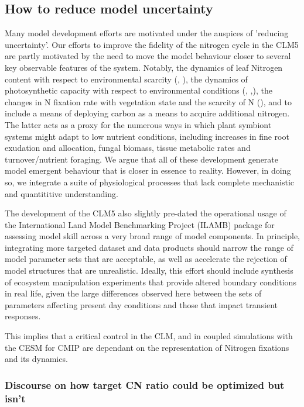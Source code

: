 \documentclass[draft,linenumbers]{agujournal}
\begin{document}
\subsection{How to reduce model uncertainty}
Many model development efforts are motivated under the auspices of 'reducing uncertainty'.  Our efforts to improve the fidelity of the nitrogen cycle in the CLM5 are partly motivated by the need to move the model behaviour closer to several key observable features of the system. Notably, the dynamics of leaf Nitrogen content with respect to environmental scarcity (\cite{zaehle2014}, \cite{brzostek2014}), the dynamics of photosynthetic capacity with respect to environmental conditions (\cite{xu2012}, \cite{ali2016},\cite{rogers2017}), the changes in N fixation rate with vegetation state and the scarcity of N (\cite{vitousek2002}), and to include a means of deploying carbon as a means to acquire additional nitrogen. The latter acts as a proxy for the numerous ways in which plant symbiont systems might adapt to low nutrient conditions, including increases in fine root exudation and allocation, fungal biomass, tissue metabolic rates and turnover/nutrient foraging.  We argue that all of these development generate model emergent behaviour that is closer in essence to reality. However, in doing so, we integrate a suite of physiological processes that lack complete mechanistic and quantititive understanding. 

The development of the CLM5 also slightly pre-dated the operational usage of the International Land Model Benchmarking Project (ILAMB) package \cite{collier2016} for assessing model skill across a very broad range of model components.  In principle, integrating more targeted dataset and data products should narrow the range of model parameter sets that are acceptable, as well as accelerate the rejection of model structures that are unrealistic. Ideally, this effort should include synthesis of ecosystem manipulation experiments that provide altered boundary conditions in real life, given the large differences observed here between the sets of parameters affecting present day conditions and those that impact transient responses. 




This implies that a critical control in the CLM, and in coupled simulations with the CESM for CMIP are dependant on the representation of Nitrogen fixations and its dynamics. 

\subsubsection{Discourse on how target CN ratio could be optimized but isn't}
\end{document}
